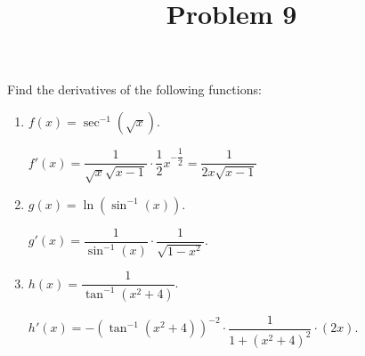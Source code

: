 \documentclass{ximera}
\title[Problem 9]{Problem 9}
\begin{document}
\begin{abstract} \end{abstract}
\maketitle


\begin{problem}
Find the derivatives of the following functions:
	\begin{enumerate}
	
	\item  $f(x) = \sec^{-1} (\sqrt{x})$.
\begin{explanation}
		$f'(x) = \dfrac{1}{\sqrt{x} \sqrt{x - 1}} \cdot \dfrac{1}{2} x^{-\dfrac{1}{2}} = \dfrac{1}{2x\sqrt{x-1}}$
		\end{explanation}
		
	\item  $g(x) = \ln (\sin^{-1}(x))$.
\begin{explanation}
		$g'(x) = \dfrac{1}{\sin^{-1}(x)} \cdot \dfrac{1}{\sqrt{1-x^2}}$.
		\end{explanation}
		
		
		
	\item  $h(x) = \dfrac{1}{\tan^{-1}(x^2 + 4)}$.  
\begin{explanation}
		$h'(x) = - \left( \tan^{-1}(x^2 + 4) \right)^{-2} \cdot \dfrac{1}{1 + (x^2 + 4)^2} \cdot (2x)$.
		\end{explanation}
			\end{enumerate}
		
\end{problem}
\end{document}

